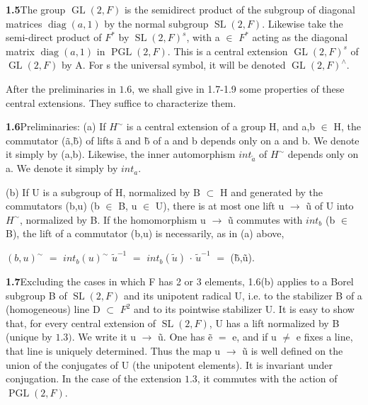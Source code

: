 \documentclass[10pt,a4paper]{article}
\begin{document}
\clearpage
{}
\label{d035-physical-010}
\par\noindent\textbf{1.5}\quad The group $\operatorname{GL}(2,F)$ is the semidirect product of the subgroup of diagonal matrices $\operatorname{diag}(a,1)$ by the normal subgroup $\operatorname{SL}(2,F)$. Likewise take the semi-direct product of $F^*$ by $\operatorname{SL}(2,F)^s$, with a $\in{}$ $F^*$ acting as the diagonal matrix $\operatorname{diag}(a,1)$ in $\operatorname{PGL}(2,F)$. This is a central extension $\operatorname{GL}(2,F)^s$ of $\operatorname{GL}(2,F)$ by A. For s the universal symbol, it will be denoted $\operatorname{GL}(2,F)^\wedge{}$.\par
\par After the preliminaries in $1.6$, we shall give in 1.7-1.9 some properties of these central extensions. They suffice to characterize them.\par
\par\noindent\textbf{1.6}\quad Preliminaries: (a) If $H^\sim$ is a central extension of a group H, and a,b $\in{}$ H, the commutator (ã,b̃) of lifts ã and b̃ of a and b depends only on a and b. We denote it simply by (a,b). Likewise, the inner automorphism $int_{\widetilde{a}}$ of $H^\sim$ depends only on a. We denote it simply by $int_a$.\par
\par (b) If U is a subgroup of H, normalized by B $\subset{}$ H and generated by the commutators (b,u) (b $\in{}$ B, u $\in{}$ U), there is at most one lift u $\to{}$ ũ of U into $H^\sim$, normalized by B. If the homomorphism u $\to{}$ ũ commutes with $int_b$ (b $\in{}$ B), the lift of a commutator (b,u) is necessarily, as in (a) above,\par
\par\smallskip\begin{center}\begin{minipage}{0.96\textwidth}\centering
$(b,u)^\sim$ $=$ $int_b(u)^\sim$ $\widetilde{u}^{-1}$ $=$ $int_b(\widetilde{u})$ $\cdot{}$ $\widetilde{u}^{-1}$ $=$ (b̃,ũ).
\end{minipage}\end{center}\smallskip
\par\noindent\textbf{1.7}\quad Excluding the cases in which F has 2 or 3 elements, 1.6(b) applies to a Borel subgroup B of $\operatorname{SL}(2,F)$ and its unipotent radical U, i.e. to the stabilizer B of a (homogeneous) line D $\subset{}$ $F^2$ and to its pointwise stabilizer U. It is easy to show that, for every central extension of $\operatorname{SL}(2,F)$, U has a lift normalized by B (unique by $1.3)$. We write it u $\to{}$ ũ. One has ẽ $=$ e, and if u $\ne{}$ e fixes a line, that line is uniquely determined. Thus the map u $\to{}$ ũ is well defined on the union of the conjugates of U (the unipotent elements). It is invariant under conjugation. In the case of the extension $1.3$, it commutes with the action of $\operatorname{PGL}(2,F)$.\par
\end{document}
